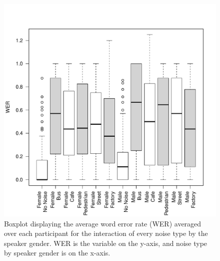 \documentclass[dissertation,copyright]{uathesis}
\makeatletter
\def\maxwidth{ %
  \ifdim\Gin@nat@width>\linewidth
    \linewidth
  \else
    \Gin@nat@width
  \fi
}
\makeatother
\begin{document}
\begin{figure}

\includegraphics[width=\maxwidth]{figure/boxplot_noiseXspkr-1} 

\caption{Boxplot displaying the average word error rate (WER) averaged over each participant for the interaction of every noise type by the speaker gender. WER is the variable on the y-axis, and noise type by speaker gender is on the x-axis.}
\label{fig:anova1_noiseXspkr_boxplot}
\end{figure}
\end{document}
